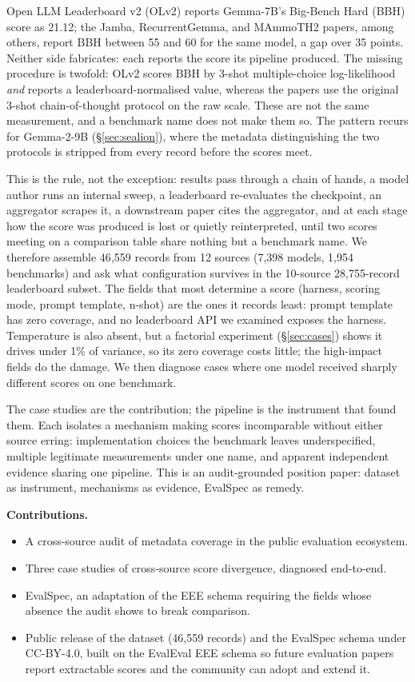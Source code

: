 \documentclass[11pt]{article}
\begin{document}
Open LLM Leaderboard v2 (OLv2) reports Gemma-7B's Big-Bench Hard (BBH) score as
21.12; the Jamba, RecurrentGemma, and MAmmoTH2 papers, among others, report BBH
between 55 and 60 for the same model, a gap over 35 points. Neither side
fabricates: each reports the score its pipeline produced. The missing procedure is
twofold: OLv2 scores BBH by 3-shot multiple-choice log-likelihood \emph{and} reports
a leaderboard-normalised value, whereas the papers use the original 3-shot
chain-of-thought protocol on the raw scale. These are not the same measurement, and
a benchmark name does not make them so. The pattern
recurs for Gemma-2-9B (\S\ref{sec:sealion}), where the metadata distinguishing
the two protocols is stripped from every record before the scores meet.

This is the rule, not the exception: results pass through a chain of hands, a
model author runs an internal sweep, a leaderboard re-evaluates the checkpoint,
an aggregator scrapes it, a downstream paper cites the aggregator, and at each
stage how the score was produced is lost or quietly reinterpreted, until two
scores meeting on a comparison table share nothing but a benchmark name. We therefore assemble 46{,}559 records from 12 sources (7{,}398
models, 1{,}954 benchmarks) and ask what configuration survives in the 10-source
28{,}755-record leaderboard subset. The fields that most determine a score
(harness, scoring mode, prompt template, n-shot) are the ones it records least:
prompt template has zero coverage, and no leaderboard API we examined exposes the
harness. Temperature is also absent, but a factorial experiment
(\S\ref{sec:cases}) shows it drives under 1\% of variance, so its zero coverage
costs little; the high-impact fields do the damage. We then diagnose cases where
one model received sharply different scores on one benchmark.

The case studies are the contribution; the pipeline is the instrument that found
them. Each isolates a mechanism making scores incomparable without either source
erring: implementation choices the benchmark leaves underspecified, multiple
legitimate measurements under one name, and apparent independent evidence sharing
one pipeline. This is an audit-grounded position paper: dataset as
instrument, mechanisms as evidence, EvalSpec as remedy.

\textbf{Contributions.}
\begin{itemize}
    \item A cross-source audit of metadata coverage in the public evaluation ecosystem.
    \item Three case studies of cross-source score divergence, diagnosed end-to-end.
    \item EvalSpec, an adaptation of the EEE schema requiring the fields whose
      absence the audit shows to break comparison.
    \item Public release of the dataset (46{,}559 records) and the EvalSpec schema
      under CC-BY-4.0, built on the EvalEval EEE schema
      \citep{evaleval2026everyevalever} so future evaluation papers report
      extractable scores and the community can adopt and extend it.
\end{itemize}
\end{document}
